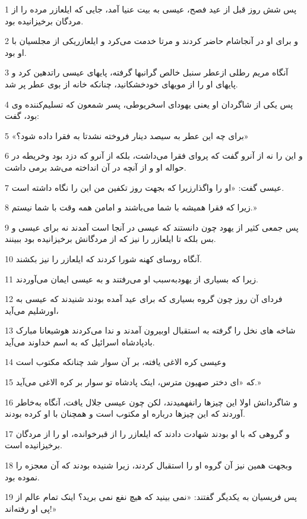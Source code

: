 \par 1 پس شش روز قبل از عید فصح، عیسی به بیت عنیا آمد، جایی که ایلعازر مرده را از مردگان برخیزانیده بود.
\par 2 و برای او در آنجاشام حاضر کردند و مرتا خدمت می‌کرد و ایلعازریکی از مجلسیان با او بود.
\par 3 آنگاه مریم رطلی ازعطر سنبل خالص گرانبها گرفته، پایهای عیسی راتدهین کرد و پایهای او را از مویهای خودخشکانید، چنانکه خانه از بوی عطر پر شد.
\par 4 پس یکی از شاگردان او یعنی یهودای اسخریوطی، پسر شمعون که تسلیم‌کننده وی بود، گفت:
\par 5 «برای چه این عطر به سیصد دینار فروخته نشدتا به فقرا داده شود؟»
\par 6 و این را نه از آنرو گفت که پروای فقرا می‌داشت، بلکه از آنرو که دزد بود وخریطه در حواله او و از آنچه در آن انداخته می‌شد برمی داشت.
\par 7 عیسی گفت: «او را واگذارزیرا که بجهت روز تکفین من این را نگاه داشته است.
\par 8 زیرا که فقرا همیشه با شما می‌باشند و امامن همه وقت با شما نیستم.»
\par 9 پس جمعی کثیر از یهود چون دانستند که عیسی در آنجا است آمدند نه برای عیسی و بس بلکه تا ایلعازر را نیز که از مردگانش برخیزانیده بود ببینند.
\par 10 آنگاه روسای کهنه شورا کردند که ایلعازر را نیز بکشند.
\par 11 زیرا که بسیاری از یهودبه‌سبب او می‌رفتند و به عیسی ایمان می‌آوردند.
\par 12 فردای آن روز چون گروه بسیاری که برای عید آمده بودند شنیدند که عیسی به اورشلیم می‌آید،
\par 13 شاخه های نخل را گرفته به استقبال اوبیرون آمدند و ندا می‌کردند هوشیعانا مبارک بادپادشاه اسرائیل که به اسم خداوند می‌آید.
\par 14 وعیسی کره الاغی یافته، بر آن سوار شد چنانکه مکتوب است
\par 15 که «ای دختر صهیون مترس، اینک پادشاه تو سوار بر کره الاغی می‌آید.»
\par 16 و شاگردانش اولا این چیزها رانفهمیدند، لکن چون عیسی جلال یافت، آنگاه به‌خاطر آوردند که این چیزها درباره او مکتوب است و همچنان با او کرده بودند.
\par 17 و گروهی که با او بودند شهادت دادند که ایلعازر را از قبرخوانده، او را از مردگان برخیزانیده است.
\par 18 وبجهت همین نیز آن گروه او را استقبال کردند، زیرا شنیده بودند که آن معجزه را نموده بود.
\par 19 پس فریسیان به یکدیگر گفتند: «نمی بینید که هیچ نفع نمی برید؟ اینک تمام عالم از پی او رفته‌اند!»
